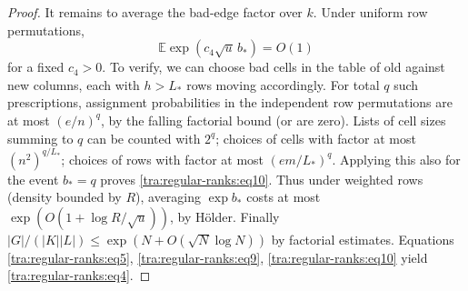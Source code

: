 \begin{proof}
It remains to average the bad-edge factor over \(k\). Under uniform row permutations,
\begin{equation}
                         \mathbb E \exp(c_4\sqrt u\, b_*)=O(1)\label{tra:regular-ranks:eq10}
\end{equation}
for a fixed \(c_4>0\). To verify, we can choose bad cells in the table of old against new columns, each with \(h>L_*\) rows moving accordingly. For total \(q\) such prescriptions, assignment probabilities in the independent row permutations are at most \((e/n)^q\), by the falling factorial bound (or are zero). Lists of cell sizes summing to \(q\) can be counted with \(2^q\); choices of cells with factor at most \((n^2)^{q/L_*}\); choices of rows with factor at most \((em/L_*)^q\). Applying this also for the event \(b_*=q\) proves \eqref{tra:regular-ranks:eq10}. Thus under weighted rows (density bounded by \(R\)), averaging \(\exp b_*\) costs at most \(\exp(O(1+\log R/\sqrt u))\), by Hölder. Finally \(|G|/(|K||L|)\le\exp(N+O(\sqrt N\log N))\) by factorial estimates. Equations \eqref{tra:regular-ranks:eq5}, \eqref{tra:regular-ranks:eq9}, \eqref{tra:regular-ranks:eq10} yield \eqref{tra:regular-ranks:eq4}.
\end{proof}
